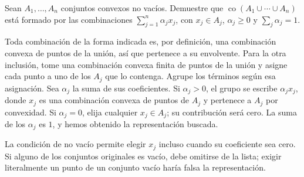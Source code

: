 \begin{ejercicio}
Sean $A_1,\ldots,A_n$ conjuntos convexos no vacíos. Demuestre que $\operatorname{co}(A_1\cup\cdots\cup A_n)$ está formado por las combinaciones $\sum_{j=1}^n\alpha_jx_j$, con $x_j\in A_j$, $\alpha_j\geq0$ y $\sum_j\alpha_j=1$.
\end{ejercicio}
\begin{solucion}
Toda combinación de la forma indicada es, por definición, una combinación convexa de puntos de la unión, así que pertenece a su envolvente. Para la otra inclusión, tome una combinación convexa finita de puntos de la unión y asigne cada punto a uno de los $A_j$ que lo contenga. Agrupe los términos según esa asignación. Sea $\alpha_j$ la suma de sus coeficientes. Si $\alpha_j>0$, el grupo se escribe $\alpha_jx_j$, donde $x_j$ es una combinación convexa de puntos de $A_j$ y pertenece a $A_j$ por convexidad. Si $\alpha_j=0$, elija cualquier $x_j\in A_j$; su contribución será cero. La suma de los $\alpha_j$ es $1$, y hemos obtenido la representación buscada.

La condición de no vacío permite elegir $x_j$ incluso cuando su coeficiente sea cero. Si alguno de los conjuntos originales es vacío, debe omitirse de la lista; exigir literalmente un punto de un conjunto vacío haría falsa la representación.
\end{solucion}

